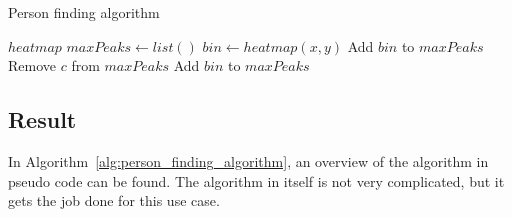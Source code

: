 \begin{algorithm}
\caption{Person finding algorithm}\label{alg:person_finding_algorithm}
\begin{algorithmic}
\Require $heatmap$
\State $maxPeaks \gets list()$
        \State $bin \gets heatmap(x, y)$
                        \State Add $bin$ to $maxPeaks$
                        \State Remove $c$ from $maxPeaks$
                    \EndIf
                \Else
                    \State Add $bin$ to $maxPeaks$
                \EndIf
            \EndIf
        \EndIf
    \EndFor
\EndFor
\end{algorithmic}
\end{algorithm}

\subsection{Result}
In Algorithm~\ref{alg:person_finding_algorithm}, an overview of the algorithm in pseudo code can be found. The algorithm in itself is not very complicated, but it gets the job done for this use case. 

